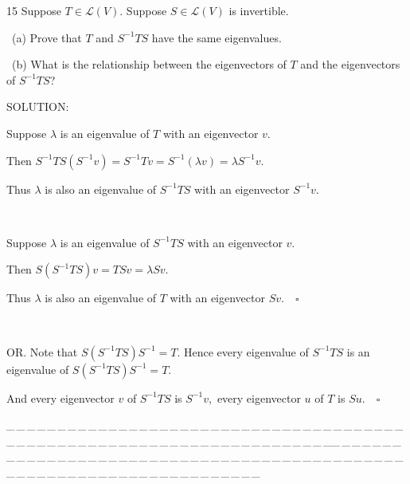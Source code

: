 \documentclass[a4paper, 11pt, UTF8]{article}
\def\Lm{\mathcal{L}}
\begin{document}
\begin{large}
{\timesbf\Large 15} {\timessl\Large 
Suppose $T\in\Lm(V)$. Suppose $S\in\Lm(V)$ is invertible.}\par\quad\,
(a) {\timessl\Large Prove that $T$ and $S^{-1}TS$ have the same eigenvalues.}\par\quad\,
(b) {\timessl\Large What is the relationship between the eigenvectors of $T$ and the eigenvectors of $S^{-1}TS$?
}\par
{\timesbf S\footnotesize{OLUTION:}}\par\quad
Suppose $\lambda$ is an eigenvalue of $T$ with an eigenvector $v$.\par\quad Then $S^{-1}TS(S^{-1}v)=S^{-1}Tv=S^{-1}(\lambda v)=\lambda S^{-1}v.$\par\quad
Thus $\lambda$ is also an eigenvalue of $S^{-1}TS$ with an eigenvector $S^{-1}v$.\par{\tiny\,\par}\quad
Suppose $\lambda$ is an eigenvalue of $S^{-1}TS$ with an eigenvector $v.$\par\quad Then $S(S^{-1}TS)v=TSv=\lambda Sv.$\par\quad
Thus $\lambda$ is also an eigenvalue of $T$ with an eigenvector $Sv.\quad\square$\par{\tiny\,\par}\quad
O{\small R.} Note that $S(S^{-1}TS)S^{-1}=T.$ Hence every eigenvalue of $S^{-1}TS$ is an eigenvalue of $S(S^{-1}TS)S^{-1}=T.$\par\quad
{\normalsize And every eigenvector $v$ of $S^{-1}TS$ is $S^{-1}v,$ every eigenvector $u$ of $T$ is $Su.$}$\quad\square$\par
\par
{\tiny \_\,\_\,\_\,\_\,\_\,\_\,\_\,\_\,\_\,\_\,\_\,\_\,\_\,\_\,\_\,\_\,\_\,\_\,\_\,\_\,\_\,\_\,\_\,\_\,\_\,\_\,\_\,\_\,\_\,\_\,\_\,\_\,\_\,\_\,\_\,\_\,\_\,\_\,\_\,\_\,\_\,\_\,\_\,\_\,\_\,\_\,\_\,\_\,\_\,\_\,\_\,\_\,\_\,\_\,\_\,\_\,\_\,\_\,\_\,\_\,\_\,\_\,\_\,\_\,\_\,\_\,\_\,\_\,\_\,\_\,\_\_\,\_\,\_\,\_\,\_\,\_\,\_\,\_\,\_\,\_\,\_\,\_\,\_\,\_\,\_\,\_\,\_\,\_\,\_\,\_\,\_\,\_\,\_\,\_\,\_\,\_\,\_\,\_\,\_\,\_\,\_\,\_\,\_\,\_\,\_\,\_\,\_\,\_\,\_\,\_\,\_\,\_\,\_\,\_\,\_\,\_\,\_\,\_\,\_\,\_\,\_\,\_\,\_\,\_\,\_\,\_\,\_\,\_\,\_\,\_\,\_\,\_\,\_\,\_\,\_\,\_\,\_\,\_\,\_\,\_\,\_}\par


\end{large}
\end{document}
